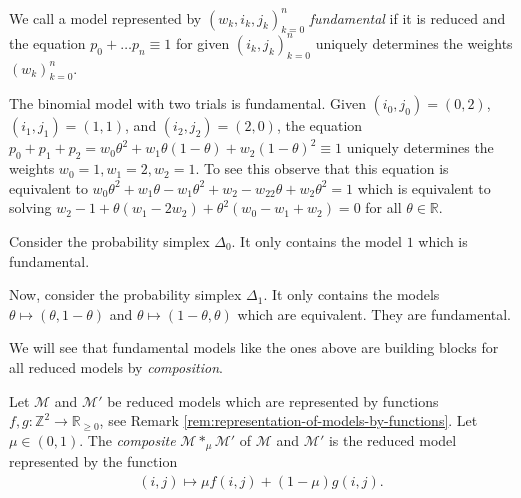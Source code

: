 \begin{definition}\label{def:fundamental-model}
    We call a model represented by \( (w_k, i_k, j_k)_{k=0}^n \) \emph{fundamental} if it is reduced and the equation \( p_0 + \dots p_n \equiv 1 \) for given \( (i_k, j_k)_{k=0}^n \) uniquely determines the weights \( (w_k)_{k=0}^n \).
\end{definition}

\begin{example}
    The binomial model with two trials is fundamental. Given \( (i_0, j_0) = (0,2) \), \( (i_1, j_1) = (1,1) \), and \( (i_2, j_2) = (2,0) \), the equation \( p_0 + p_1 + p_2 = w_0\theta^2 + w_1\theta(1-\theta) + w_2(1-\theta)^2 \equiv 1 \) uniquely determines the weights \( w_0 = 1, w_1 = 2, w_2 = 1 \). To see this observe that this equation is equivalent to \( w_0\theta^2 + w_1\theta - w_1 \theta^2 + w_2 -w_22\theta + w_2\theta^2 = 1\) which is equivalent to solving \( w_2 - 1 + \theta(w_1 - 2w_2) + \theta^2(w_0 - w_1 + w_2) = 0 \) for all \( \theta \in \mathbb{R} \).
\end{example}

\begin{example}\label{ex:prob-simplex-0}
    Consider the probability simplex \( \Delta_0 \). It only contains the model \( 1 \) which is fundamental.
\end{example}

\begin{example}\label{ex:prob-simplex-1}
    Now, consider the probability simplex \( \Delta_1 \). It only contains the models \( \theta \mapsto (\theta, 1-\theta) \) and \( \theta \mapsto (1-\theta, \theta) \) which are equivalent. They are fundamental.
\end{example}

We will see that fundamental models like the ones above are building blocks for all reduced models by \emph{composition}.

\begin{definition}
    Let \( \mathcal{M} \) and \( \mathcal{M}' \) be reduced models which are represented by functions \( f,g : \mathbb{Z}^2 \to \mathbb{R}_{\geq 0} \), see Remark \ref{rem:representation-of-models-by-functions}. Let \( \mu \in (0,1) \). The \emph{composite} \( \mathcal{M} *_\mu \mathcal{M}' \) of \( \mathcal{M} \) and \( \mathcal{M}' \) is the reduced model represented by the function 
    \begin{align*}
        (i,j) \mapsto \mu f(i,j) + (1-\mu) g(i,j).
    \end{align*}
\end{definition}


